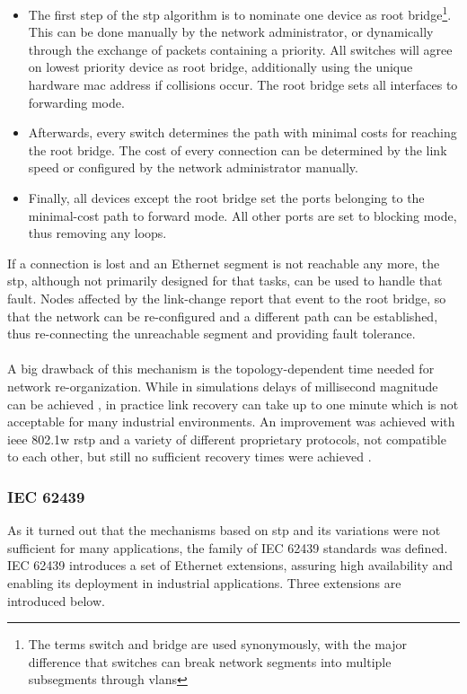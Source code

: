\begin{itemize}
 \item The first step of the \gls{stp} algorithm is to nominate one device as root bridge\footnote{The terms switch and bridge are used synonymously,
with the major difference that switches can break network segments into multiple subsegments through \glspl{vlan}}. This can be done manually by the network administrator,
or dynamically through the exchange of packets containing a priority. All switches will agree on lowest priority device as root bridge, additionally using the unique
hardware \gls{mac} address if collisions occur. The root bridge sets all interfaces to forwarding mode. 
 \item Afterwards, every switch determines the path with minimal costs for reaching the root bridge. The cost of every connection can be determined by the link
 speed or configured by the network administrator manually.
 \item Finally, all devices except the root bridge set the ports belonging to the minimal-cost path to forward mode. All other ports are set to blocking mode, thus removing
 any loops.
\end{itemize}
If a connection is lost and an Ethernet segment is not 
reachable any more, the \gls{stp}, although not primarily designed for that tasks, can be used to handle that fault. Nodes affected by the link-change report
that event to the root bridge, so that the network can be re-configured and a different path can be established, thus re-connecting the unreachable segment
and providing fault tolerance. 
\\
\\
A big drawback of this mechanism is the topology-dependent
time needed for network re-organization. While in simulations delays of millisecond magnitude can be achieved \cite{4447112}, in practice link recovery
can take up to one minute which is not acceptable for many industrial environments. An improvement was achieved with \gls{ieee} 802.1w \gls{rstp} and
a variety of different proprietary protocols, not compatible to each other, but still no sufficient recovery times were achieved \cite{1704183}.

\subsubsection{IEC 62439}

As it turned out that the mechanisms based on \gls{stp} and its variations were not 
sufficient for many applications, the family of IEC 62439 standards was defined. IEC 62439 introduces a set of Ethernet extensions, assuring high availability
and enabling its deployment in industrial applications. Three extensions are introduced below.

